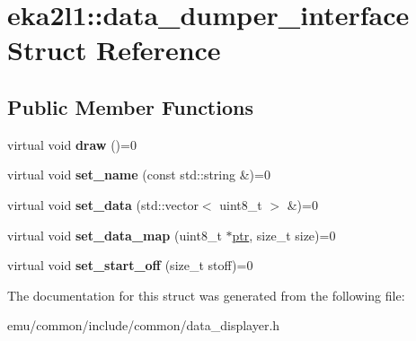 \hypertarget{structeka2l1_1_1data__dumper__interface}{}\section{eka2l1\+:\+:data\+\_\+dumper\+\_\+interface Struct Reference}
\label{structeka2l1_1_1data__dumper__interface}
\subsection*{Public Member Functions}
\begin{DoxyCompactItemize}
\item 
\mbox{\label{structeka2l1_1_1data__dumper__interface_ae3aa1c46ced4597c3d29d472043ac347}} 
virtual void {\bfseries draw} ()=0
\item 
\mbox{\label{structeka2l1_1_1data__dumper__interface_a9e76740db8918d5aacf28dac369018c3}} 
virtual void {\bfseries set\+\_\+name} (const std\+::string \&)=0
\item 
\mbox{\label{structeka2l1_1_1data__dumper__interface_a2fbcc2905cabed8b0065cc1649573743}} 
virtual void {\bfseries set\+\_\+data} (std\+::vector$<$ uint8\+\_\+t $>$ \&)=0
\item 
\mbox{\label{structeka2l1_1_1data__dumper__interface_ad777760f8982bf4d57239989e5c284b5}} 
virtual void {\bfseries set\+\_\+data\+\_\+map} (uint8\+\_\+t $\ast$\mbox{\hyperlink{classeka2l1_1_1ptr}{ptr}}, size\+\_\+t size)=0
\item 
\mbox{\label{structeka2l1_1_1data__dumper__interface_adc6b5a4bb031c420cc33302e970b8d16}} 
virtual void {\bfseries set\+\_\+start\+\_\+off} (size\+\_\+t stoff)=0
\end{DoxyCompactItemize}


The documentation for this struct was generated from the following file\+:\begin{DoxyCompactItemize}
\item 
emu/common/include/common/data\+\_\+displayer.\+h\end{DoxyCompactItemize}
